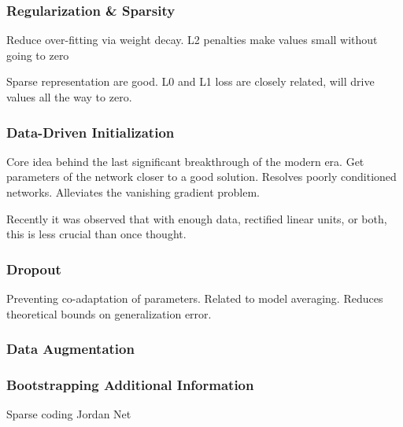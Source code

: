 \subsubsection{Regularization \& Sparsity}
Reduce over-fitting via weight decay.
L2 penalties make values small without going to zero

Sparse representation are good.
L0 and L1 loss are closely related, will drive values all the way to zero.

\subsubsection{Data-Driven Initialization}

Core idea behind the last significant breakthrough of the modern era.
Get parameters of the network closer to a good solution.
Resolves poorly conditioned networks.
Alleviates the vanishing gradient problem.

Recently it was observed that with enough data, rectified linear units, or both, this is less crucial than once thought.


\subsubsection{Dropout}
Preventing co-adaptation of parameters.
Related to model averaging.
Reduces theoretical bounds on generalization error.


\subsubsection{Data Augmentation}


\subsubsection{Bootstrapping Additional Information}
Sparse coding
Jordan Net



